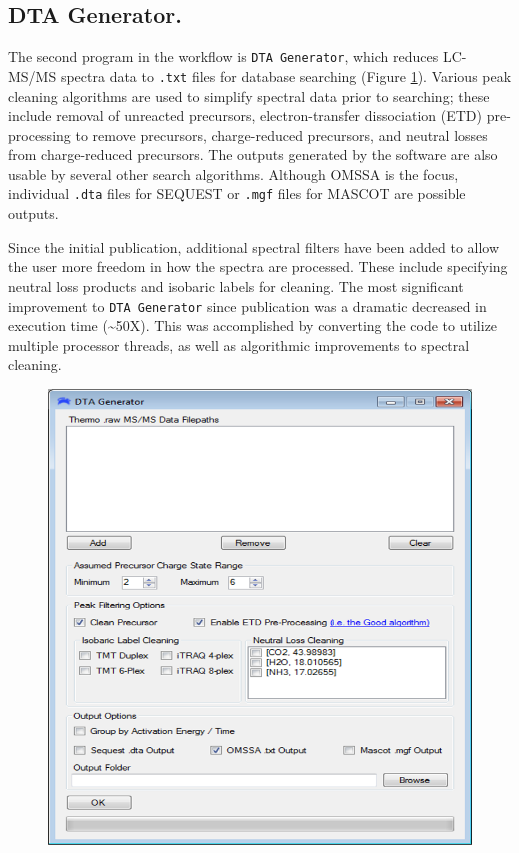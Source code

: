 \subsection*{DTA Generator.}
The second program in the \compass{} workflow is \texttt{DTA Generator}, which reduces LC-MS/MS spectra data to \texttt{.txt} files for database searching (Figure \ref{fig:dtagenerator}). Various peak cleaning algorithms are used to simplify spectral data prior to searching; these include removal of unreacted precursors, electron-transfer dissociation (ETD) pre-processing to remove precursors, charge-reduced precursors, and neutral losses from charge-reduced precursors.\cite{good} The outputs generated by the software are also usable by several other search algorithms. Although OMSSA is the focus, individual \texttt{.dta} files for SEQUEST or \texttt{.mgf} files for MASCOT are possible outputs.\cite{sequest,mascot}

Since the initial publication, additional spectral filters have been added to allow the user more freedom in how the spectra are processed. These include specifying neutral loss products and isobaric labels for cleaning. The most significant improvement to \texttt{DTA Generator} since publication was a dramatic decreased in execution time (\textasciitilde50X). This was accomplished by converting the code to utilize multiple processor threads, as well as algorithmic improvements to spectral cleaning. 
\begin{figure}[p]
	\centering
	\includegraphics[width=0.8\columnwidth]{csmsl/dtagenerator.png}
	\label{fig:dtagenerator}
\end{figure}

